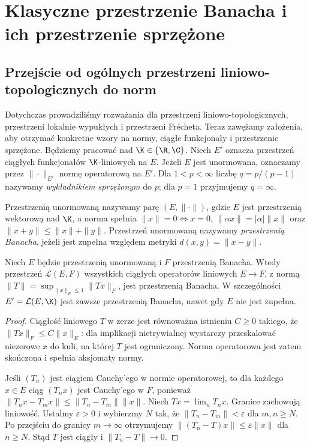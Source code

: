 \setcounter{section}{11}
\section{Klasyczne przestrzenie Banacha i ich przestrzenie sprzężone}
\label{sec:klasyczne-banach12}

\providecommand{\atlasref}[2]{#2}


\subsection{Przejście od ogólnych przestrzeni liniowo-topologicznych do norm}

Dotychczas prowadziliśmy rozważania dla przestrzeni liniowo-topologicznych,
przestrzeni lokalnie wypukłych i przestrzeni Frécheta. Teraz zawężamy
założenia, aby otrzymać konkretne wzory na normy, ciągłe funkcjonały
i przestrzenie sprzężone. Będziemy pracować nad $\K\in\{\R,\C\}$.
Niech $E'$ oznacza przestrzeń ciągłych funkcjonałów $\K$-liniowych na $E$.
Jeżeli $E$ jest unormowana, oznaczamy przez $\|\cdot\|_{E'}$ normę
operatorową na $E'$. Dla $1<p<\infty$ liczbę $q=p/(p-1)$ nazywamy
\emph{wykładnikiem sprzężonym} do $p$; dla $p=1$ przyjmujemy $q=\infty$.

\begin{definicja}
\label{def:banach12}
Przestrzenią unormowaną nazywamy parę $(E,\|\cdot\|)$, gdzie $E$
jest przestrzenią wektorową nad $\K$, a norma spełnia
$\|x\|=0\iff x=0$, $\|\alpha x\|=|\alpha|\|x\|$ oraz
$\|x+y\|\le\|x\|+\|y\|$. Przestrzeń unormowaną nazywamy
\emph{przestrzenią Banacha}, jeżeli jest zupełna względem metryki
$d(x,y)=\|x-y\|$.
\end{definicja}

\begin{stwierdzenie}
\label{prop:operator-norm12}
Niech $E$ będzie przestrzenią unormowaną i $F$ przestrzenią Banacha.
Wtedy przestrzeń $\mathcal L(E,F)$ wszystkich ciągłych operatorów
liniowych $E\to F$, z normą
$\|T\|=\sup_{\|x\|_E\le1}\|Tx\|_F$, jest przestrzenią Banacha.
W szczególności $E'=\mathcal L(E,\K)$ jest zawsze przestrzenią
Banacha, nawet gdy $E$ nie jest zupełna.
\end{stwierdzenie}
\begin{proof}
Ciągłość liniowego $T$ w zerze jest równoważna istnieniu $C\ge0$
takiego, że $\|Tx\|_F\le C\|x\|_E$: dla implikacji nietrywialnej
wystarczy przeskalować niezerowe $x$ do kuli, na której $T$ jest
ograniczony. Norma operatorowa jest zatem skończona i spełnia
aksjomaty normy.

Jeśli $(T_n)$ jest ciągiem Cauchy'ego w normie operatorowej,
to dla każdego $x\in E$ ciąg $(T_nx)$ jest Cauchy'ego w $F$, ponieważ
$\|T_nx-T_mx\|\le\|T_n-T_m\|\|x\|$.
Niech $Tx=\lim_nT_nx$. Granice zachowują liniowość. Ustalmy
$\varepsilon>0$ i wybierzmy $N$ tak, że
$\|T_n-T_m\|<\varepsilon$ dla $m,n\ge N$.
Po przejściu do granicy $m\to\infty$ otrzymujemy
$\|(T_n-T)x\|\le\varepsilon\|x\|$ dla $n\ge N$.
Stąd $T$ jest ciągły i $\|T_n-T\|\to0$.
\end{proof}

